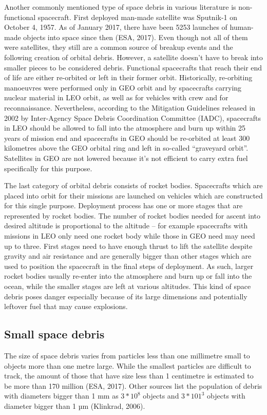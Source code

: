 	Another commonly mentioned type of space debris in various literature is non-functional spacecraft. First deployed man-made satellite was Sputnik-1 on October 4, 1957. As of January 2017, there have been 5253 launches of human-made objects into space since then (ESA, 2017). Even though not all of them were satellites, they still are a common source of breakup events and the following creation of orbital debris. However, a satellite doesn’t have to break into smaller pieces to be considered debris. Functional spacecrafts that reach their end of life are either re-orbited or left in their former orbit. Historically, re-orbiting manoeuvres were performed only in GEO orbit and by spacecrafts carrying nuclear material in LEO orbit, as well as for vehicles with crew and for reconnaissance. Nevertheless, according to the Mitigation Guidelines released in 2002 by Inter-Agency Space Debris Coordination Committee (IADC), spacecrafts in LEO should be allowed to fall into the atmosphere and burn up within 25 years of mission end and spacecrafts in GEO should be re-orbited at least 300 kilometres above the GEO orbital ring and left in so-called “graveyard orbit”. Satellites in GEO are not lowered because it’s not efficient to carry extra fuel specifically for this purpose.
	
	The last category of orbital debris consists of rocket bodies. Spacecrafts which are placed into orbit for their missions are launched on vehicles which are constructed for this single purpose. Deployment process has one or more stages that are represented by rocket bodies. The number of rocket bodies needed for ascent into desired altitude is proportional to the altitude – for example spacecrafts with missions in LEO only need one rocket body while those in GEO need may need up to three. First stages need to have enough thrust to lift the satellite despite gravity and air resistance and are generally bigger than other stages which are used to position the spacecraft in the final steps of deployment. As such, larger rocket bodies usually re-enter into the atmosphere and burn up or fall into the ocean, while the smaller stages are left at various altitudes. This kind of space debris poses danger especially because of its large dimensions and potentially leftover fuel that may cause explosions.
	
\subsection{Small space debris}\label{subsec:small_space_debris}
The size of space debris varies from particles less than one millimetre small to objects more than one metre large. While the smallest particles are difficult to track, the amount of those that have size less than 1 centimetre is estimated to be more than 170 million (ESA, 2017). Other sources list the population of debris with diameters bigger than 1 mm as $3*10^8$ objects and $3*101^3$ objects with diameter bigger than 1 µm (Klinkrad, 2006). 

